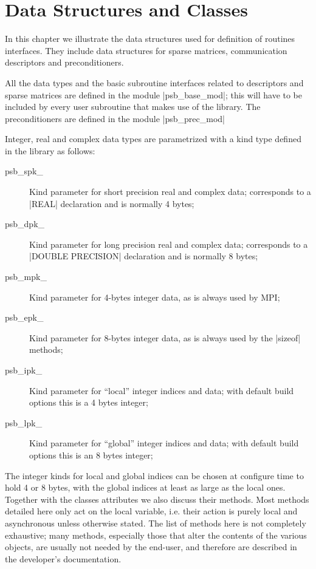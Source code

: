 \section{Data Structures and Classes}
\label{sec:datastruct}

In this chapter we  illustrate the  data structures used for definition of
routines interfaces. They  include data structures for sparse matrices,
communication descriptors and preconditioners.%

All the data types and the basic subroutine interfaces related to
descriptors and sparse matrices are defined in
the module \fortinline|psb_base_mod|; this will have to be included by every
user subroutine that makes use of the library. The preconditioners are
defined in the module \fortinline|psb_prec_mod|

Integer, real and complex data types are parametrized with a kind type
defined in the library as follows: 
\begin{description}
\item[psb\_spk\_] Kind parameter for short precision real and complex
  data; corresponds to a \fortinline|REAL| declaration and is
  normally 4 bytes; 
\item[psb\_dpk\_] Kind parameter for long precision real and complex
  data; corresponds to a \fortinline|DOUBLE PRECISION| declaration and is
  normally 8 bytes;
\item[psb\_mpk\_] Kind parameter for 4-bytes integer data, as is
  always used by MPI; 
\item[psb\_epk\_] Kind parameter for 8-bytes integer data, as is
  always used by the \fortinline|sizeof| methods;
\item[psb\_ipk\_] Kind parameter for ``local'' integer indices and data;
  with default build options this is a 4 bytes integer;
\item[psb\_lpk\_] Kind parameter for ``global'' integer indices and data;
  with default build options this is an 8 bytes integer;
\end{description}
The integer kinds for local and global indices can be chosen at
configure time to hold 4 or 8 bytes, with the global indices at least
as large as the local ones. 
Together with the classes attributes we also discuss their
methods.  Most methods detailed here only act on the local variable,
i.e. their action is purely local and asynchronous unless otherwise
stated. 
The list of methods here is not completely exhaustive; many methods,
especially those that alter the contents of the various objects, are
usually not needed by the end-user, and therefore are described in the
developer's documentation. 


